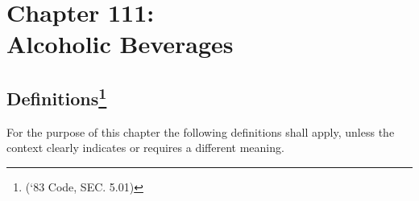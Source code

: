 \chapter*{Chapter 111: \\
	Alcoholic Beverages}
    \vspace{-1cm}
    \minitoc
    \pagebreak


\section{Definitions\footnote{(‘83 Code, SEC. 5.01)}}
For the purpose of this chapter the following definitions shall apply, unless the context clearly indicates or requires a different meaning.

